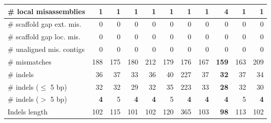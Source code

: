 \documentclass[12pt,a4paper]{article}
\begin{document}
\begin{table}[ht]
\begin{center}
\begin{tabular}{|l*{10}{|r}|}
\# local misassemblies & {\bf 1} & {\bf 1} & {\bf 1} & {\bf 1} & {\bf 1} & {\bf 1} & {\bf 1} & 4 & {\bf 1} & {\bf 1} \\ \hline
\# scaffold gap ext. mis. & 0 & 0 & 0 & 0 & 0 & 0 & 0 & 0 & 0 & 0 \\ \hline
\# scaffold gap loc. mis. & 0 & 0 & 0 & 0 & 0 & 0 & 0 & 0 & 0 & 0 \\ \hline
\# unaligned mis. contigs & 0 & 0 & 0 & 0 & 0 & 0 & 0 & 0 & 0 & 0 \\ \hline
\# mismatches & 188 & 175 & 180 & 212 & 179 & 176 & 167 & {\bf 159} & 163 & 209 \\ \hline
\# indels & 36 & 37 & 33 & 36 & 40 & 227 & 37 & {\bf 32} & 37 & 34 \\ \hline
\hspace{5mm}\# indels ($\leq$ 5 bp) & 32 & 32 & 29 & 32 & 35 & 223 & 33 & {\bf 28} & 32 & 30 \\ \hline
\hspace{5mm}\# indels ($>$ 5 bp) & {\bf 4} & 5 & {\bf 4} & {\bf 4} & 5 & {\bf 4} & {\bf 4} & {\bf 4} & 5 & {\bf 4} \\ \hline
Indels length & 102 & 115 & 101 & 102 & 120 & 365 & 103 & {\bf 98} & 113 & 102 \\ \hline
\end{tabular}
\end{center}
\end{table}
\end{document}
